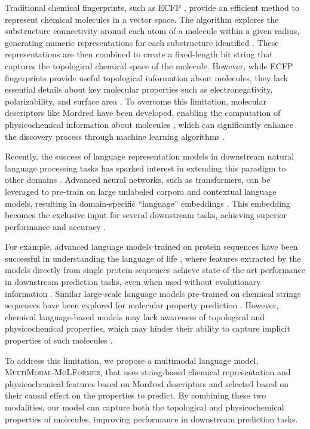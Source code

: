 \documentclass{article}
\begin{document}
Traditional chemical fingerprints, such as ECFP \cite{mater2019deep}, provide an efficient method to represent chemical molecules in a vector space. 
The algorithm explores the substructure connectivity around each atom of a molecule within a given radius, generating numeric representations for each substructure identified \cite{wigh2022review}. 
These representations are then combined to create a fixed-length bit string that captures the topological chemical space of the molecule.
However, while ECFP fingerprints provide useful topological information about molecules, they lack essential details about key molecular properties such as electronegativity, polarizability, and surface area \cite{moriwaki2018mordred}.
To overcome this limitation, molecular descriptors like Mordred have been developed, enabling the computation of physicochemical information about molecules \cite{keith2021combining}, which can significantly enhance the discovery process through machine learning algorithms \cite{yang2022ensemble}.

Recently, the success of language representation models in downstream natural language processing tasks has sparked interest in extending this paradigm to other domains \cite{bommasani2021opportunities}. 
Advanced neural networks, such as transformers, can be leveraged to pre-train on large unlabeled corpora and contextual language models, resulting in domain-specific ``language'' embeddings \cite{touvron2023llama}. 
This embedding becomes the exclusive input for several downstream tasks, achieving superior performance and accuracy \cite{bommasani2021opportunities}.

For example, advanced language models trained on protein sequences have been successful in understanding the language of life \cite{madani2023large}, where features extracted by the models directly from single protein sequences achieve state-of-the-art performance in downstream prediction tasks, even when used without evolutionary information \cite{ferruz2022controllable}. Similar large-scale language models pre-trained on chemical strings sequences have been explored for molecular property prediction \cite{ross2022large}. However, chemical language-based models may lack awareness of topological and physicochemical properties, which may hinder their ability to capture implicit properties of such molecules \cite{yang2022ensemble}.

To address this limitation, we propose a multimodal language model, \textsc{MultiModal}-\textsc{MoLFormer}, that uses string-based chemical representation and physicochemical features based on Mordred descriptors and selected based on their causal effect on the properties to predict. By combining these two modalities, our model can capture both the topological and physicochemical properties of molecules, improving performance in downstream prediction tasks.
\end{document}
